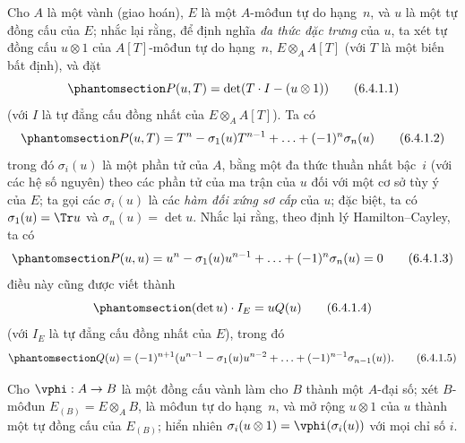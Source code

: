 \documentclass[oneside,10pt]{amsart}
\makeatletter
\newcommand{\ega@arrow}[2]{\mathchoice{#1}{#2}{#2}{#2}}
\renewcommand{\to}{\ega@arrow{\longrightarrow}{\rightarrow}}
\newcommand{\oldpage}[2][]{\marginnote{\normalfont\footnotesize\textbf{#1}~|~#2}\ignorespaces}
\let\EGAOriginalLabel\label
\renewcommand{\label}[1]{\phantomsection\EGAOriginalLabel{#1}}
\makeatother
\begin{document}
\begin{env}[6.4.1]
\label{II.6.4.1}
Cho $A$ là một vành (giao hoán), $E$ là một $A$-môđun tự do hạng~$n$, và $u$ là một tự đồng cấu của $E$;
nhắc lại rằng, để định nghĩa \emph{đa thức đặc trưng} của $u$, ta xét tự đồng cấu $u\otimes1$ của $A[T]$-môđun tự do hạng~$n$, $E\otimes_A A[T]$ (với $T$ là một biến bất định), và đặt
\[
\label{II.6.4.1.1}
  P(u,T) = \det(T\cdot I-(u\otimes 1))
\tag{6.4.1.1}
\]
(với $I$ là tự đẳng cấu đồng nhất của $E\otimes_A A[T]$).
Ta có
\[
\label{II.6.4.1.2}
  P(u,T) = T^n - \sigma_1(u)T^{n-1} + \ldots + (-1)^n\sigma_n(u)
\tag{6.4.1.2}
\]
trong đó $\sigma_i(u)$ là một phần tử của $A$, bằng một đa thức thuần nhất bậc~$i$ (với các hệ số nguyên) theo các phần tử của ma trận của $u$ đối với một cơ sở tùy ý của $E$;
ta gọi các $\sigma_i(u)$ là các \emph{hàm đối xứng sơ cấp} của $u$;
đặc biệt, ta có $\sigma_1(u)=\Tr u$ và $\sigma_n(u)=\det u$.
Nhắc lại rằng, theo định lý Hamilton--Cayley, ta có
\[
\label{II.6.4.1.3}
  P(u,u) = u^n - \sigma_1(u)u^{n-1} + \ldots + (-1)^n\sigma_n(u) = 0
\tag{6.4.1.3}
\]
\oldpage[II]{121}
điều này cũng được viết thành
\[
\label{II.6.4.1.4}
  (\det u)\cdot I_E = uQ(u)
\tag{6.4.1.4}
\]
(với $I_E$ là tự đẳng cấu đồng nhất của $E$), trong đó
\[
\label{II.6.4.1.5}
  Q(u) = (-1)^{n+1}(u^{n-1}-\sigma_1(u)u^{n-2}+\ldots+(-1)^{n-1}\sigma_{n-1}(u)).
\tag{6.4.1.5}
\]

Cho $\vphi:A\to B$ là một đồng cấu vành làm cho $B$ thành một $A$-đại số;
xét $B$-môđun $E_{(B)}=E\otimes_A B$, là môđun tự do hạng~$n$, và mở rộng $u\otimes1$ của $u$ thành một tự đồng cấu của $E_{(B)}$;
hiển nhiên $\sigma_i(u\otimes1)=\vphi(\sigma_i(u))$ với mọi chỉ số $i$.
\end{env}
\end{document}
